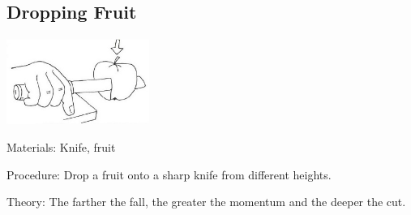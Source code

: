 \begin{multicols}{2}
\subsection{Dropping Fruit}

\begin{center}
\includegraphics[width=0.35\textwidth]{./img/vso/dropping-fruit.jpg}
\end{center}

\begin{description*}
\item[Materials:]{Knife, fruit}
\item[Procedure:]{Drop a fruit onto a sharp knife from different heights.}
\item[Theory:]{The farther the fall, the greater the momentum and the deeper the cut.}
\end{description*}

%
%


\end{multicols}
